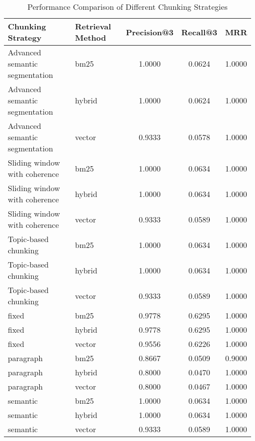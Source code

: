 \begin{table}[htbp]
\caption{Performance Comparison of Different Chunking Strategies}
\begin{center}
\begin{tabular}{|l|l|c|c|c|}
\hline
\textbf{Chunking Strategy} & \textbf{Retrieval Method} & \textbf{Precision@3} & \textbf{Recall@3} & \textbf{MRR} \\ 
\hline
Advanced semantic segmentation & bm25 & 1.0000 & 0.0624 & 1.0000 \\ 
Advanced semantic segmentation & hybrid & 1.0000 & 0.0624 & 1.0000 \\ 
Advanced semantic segmentation & vector & 0.9333 & 0.0578 & 1.0000 \\ 
Sliding window with coherence & bm25 & 1.0000 & 0.0634 & 1.0000 \\ 
Sliding window with coherence & hybrid & 1.0000 & 0.0634 & 1.0000 \\ 
Sliding window with coherence & vector & 0.9333 & 0.0589 & 1.0000 \\ 
Topic-based chunking & bm25 & 1.0000 & 0.0634 & 1.0000 \\ 
Topic-based chunking & hybrid & 1.0000 & 0.0634 & 1.0000 \\ 
Topic-based chunking & vector & 0.9333 & 0.0589 & 1.0000 \\ 
fixed & bm25 & 0.9778 & 0.6295 & 1.0000 \\ 
fixed & hybrid & 0.9778 & 0.6295 & 1.0000 \\ 
fixed & vector & 0.9556 & 0.6226 & 1.0000 \\ 
paragraph & bm25 & 0.8667 & 0.0509 & 0.9000 \\ 
paragraph & hybrid & 0.8000 & 0.0470 & 1.0000 \\ 
paragraph & vector & 0.8000 & 0.0467 & 1.0000 \\ 
semantic & bm25 & 1.0000 & 0.0634 & 1.0000 \\ 
semantic & hybrid & 1.0000 & 0.0634 & 1.0000 \\ 
semantic & vector & 0.9333 & 0.0589 & 1.0000 \\ 
\hline
\end{tabular}
\label{tab:chunking}
\end{center}
\end{table}
